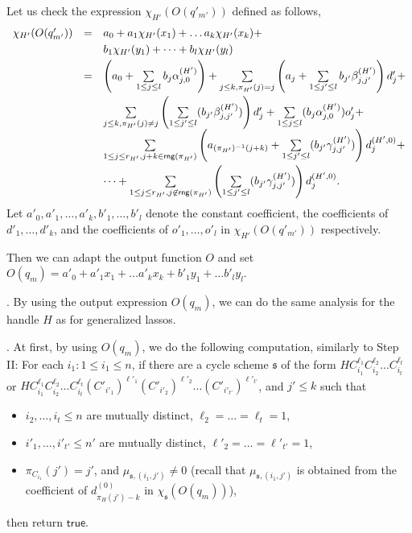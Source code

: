 \documentclass[runningheads,a4paper]{llncs}
\def\schm{{\mathfrak{s} }}
\newcommand\rng{\mathsf{rng}}
\newcommand\ltrue{\mathsf{true}}
\begin{document}
Let us check the expression $\chi_{H'}(O(q'_{m'}))$ defined as follows,
\[
\begin{array}{l c l}
\smallskip
\chi_{H'}(O(q'_{m'})) & = & a_0 + a_1 \chi_{H'}(x_1) + \dots a_k \chi_{H'}(x_k) + \\
\smallskip
& & b_1 \chi_{H'}(y_1) + \dots + b_l \chi_{H'}(y_l) \\
\smallskip
&  = &  \left(a_0+\sum \limits_{1 \le j \le l} b_j \alpha^{(H')}_{j,0} \right) + \sum \limits_{j \le k, \pi_{H'}(j)=j} \left(a_j + \sum \limits_{1 \le j' \le l} b_{j'} \beta^{(H')}_{j,j'} \right) d'_j  + \\
%
& & \sum \limits_{j \le k, \pi_{H'}(j) \neq j} \left(\sum \limits_{1 \le j' \le l} (b_{j'} \beta^{(H')}_{j,j'})\right) d'_j + \sum \limits_{1\le j \le l} (b_{j} \alpha^{(H')}_{j,0}) o'_{j} + \\
\smallskip
%
& & \sum \limits_{1 \le j \le r_{H'}, j+k \in \rng(\pi_{H'})} \left(a_{(\pi_{H'})^{-1}(j+k)}+\sum \limits_{1 \le j' \le l} (b_{j'} \gamma^{(H')}_{j,j'})\right) d^{(H',0)}_j +\\ & & \dots  + \sum \limits_{1 \le j \le r_{H'}, j \not \in \rng(\pi_{H'})} \left(\sum \limits_{1 \le j' \le l} (b_{j'} \gamma^{(H')}_{j,j'})\right) d^{(H',0)}_j.
\end{array}
\] 
Let $a'_0,a'_1,\dots,a'_k,b'_1,\dots,b'_l$ denote the constant coefficient, the coefficients of $d'_1,\dots,d'_k$, and the coefficients of $o'_1,\dots,o'_l$ in $\chi_{H'}(O(q'_{m'}))$ respectively. 

Then we can adapt the output function $O$ and set $O(q_m) = a'_0 + a'_1 x_1 + \dots a'_k x_k + b'_1 y_1 + \dots b'_l y_l$.


\smallskip

. By using the output expression $O(q_m)$, we can do the same analysis for the handle $H$ as for generalized lassos.

\smallskip 
{}. At first, by using $O(q_m)$, we do the following computation, similarly to Step II: For each $i_1: 1 \le i_1 \le n$, if there are a cycle scheme $\schm$ of the form  
$HC_{i_1}^{\ell_1} C_{i_2}^{\ell_2} \dots C_{i_t}^{\ell_t}
$
or 
$HC_{i_1}^{\ell_1} C_{i_2}^{\ell_2} \dots C_{i_t}^{\ell_t} (C'_{i'_1})^{\ell'_1} (C'_{i'_2})^{\ell'_2} \dots (C'_{i'_{t'}})^{\ell'_{t'}}$,
and $j' \le k$ such that 
\begin{itemize}
\item $i_2,\dots,i_t \le n$ are mutually distinct, $\ell_2 = \dots = \ell_t = 1$, 
%
\item $i'_1,\dots,i'_{t'} \le n'$ are mutually distinct, $\ell'_2 = \dots = \ell'_{t'} = 1$, 
%
\item $\pi_{C_{i_1}}(j')=j'$, and $\mu_{\schm,(i_1,j')} \neq 0$ (recall that $\mu_{\schm,(i_1,j')}$ is obtained from the coefficient of $d^{(0)}_{\pi_H(j')-k}$ in  $\chi_\schm(O(q_m))$), 
\end{itemize}
then return $\ltrue$. 
\end{document}
